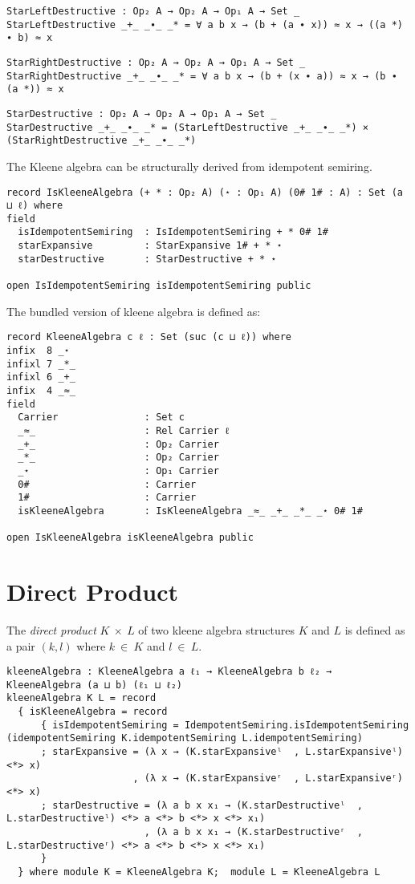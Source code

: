 \begin{verbatim}
StarLeftDestructive : Op₂ A → Op₂ A → Op₁ A → Set _
StarLeftDestructive _+_ _∙_ _* = ∀ a b x → (b + (a ∙ x)) ≈ x → ((a *) ∙ b) ≈ x
\end{verbatim}
\begin{verbatim}
StarRightDestructive : Op₂ A → Op₂ A → Op₁ A → Set _
StarRightDestructive _+_ _∙_ _* = ∀ a b x → (b + (x ∙ a)) ≈ x → (b ∙ (a *)) ≈ x
\end{verbatim}
\begin{verbatim}
StarDestructive : Op₂ A → Op₂ A → Op₁ A → Set _
StarDestructive _+_ _∙_ _* = (StarLeftDestructive _+_ _∙_ _*) × (StarRightDestructive _+_ _∙_ _*)
\end{verbatim}
The Kleene algebra can be structurally derived from idempotent semiring. 
\begin{verbatim}
record IsKleeneAlgebra (+ * : Op₂ A) (⋆ : Op₁ A) (0# 1# : A) : Set (a ⊔ ℓ) where
field
  isIdempotentSemiring  : IsIdempotentSemiring + * 0# 1#
  starExpansive         : StarExpansive 1# + * ⋆
  starDestructive       : StarDestructive + * ⋆

open IsIdempotentSemiring isIdempotentSemiring public
\end{verbatim}
The bundled version of kleene algebra is defined as: 
\begin{verbatim}
record KleeneAlgebra c ℓ : Set (suc (c ⊔ ℓ)) where
infix  8 _⋆
infixl 7 _*_
infixl 6 _+_
infix  4 _≈_
field
  Carrier               : Set c
  _≈_                   : Rel Carrier ℓ
  _+_                   : Op₂ Carrier
  _*_                   : Op₂ Carrier
  _⋆                    : Op₁ Carrier
  0#                    : Carrier
  1#                    : Carrier
  isKleeneAlgebra       : IsKleeneAlgebra _≈_ _+_ _*_ _⋆ 0# 1#

open IsKleeneAlgebra isKleeneAlgebra public
\end{verbatim}
\section{Direct Product}
The \textit{direct product} $K \ \times \ L$ of two kleene algebra structures
$K$ and $L$ is defined as a pair $(k,l)$ where $k \ \in \ K$ and $l \ \in \ L$.
\begin{verbatim}
kleeneAlgebra : KleeneAlgebra a ℓ₁ → KleeneAlgebra b ℓ₂ → KleeneAlgebra (a ⊔ b) (ℓ₁ ⊔ ℓ₂)
kleeneAlgebra K L = record
  { isKleeneAlgebra = record
      { isIdempotentSemiring = IdempotentSemiring.isIdempotentSemiring (idempotentSemiring K.idempotentSemiring L.idempotentSemiring)
      ; starExpansive = (λ x → (K.starExpansiveˡ  , L.starExpansiveˡ) <*> x)
                      , (λ x → (K.starExpansiveʳ  , L.starExpansiveʳ) <*> x)
      ; starDestructive = (λ a b x x₁ → (K.starDestructiveˡ  , L.starDestructiveˡ) <*> a <*> b <*> x <*> x₁)
                        , (λ a b x x₁ → (K.starDestructiveʳ  , L.starDestructiveʳ) <*> a <*> b <*> x <*> x₁)
      }
  } where module K = KleeneAlgebra K;  module L = KleeneAlgebra L
\end{verbatim}

